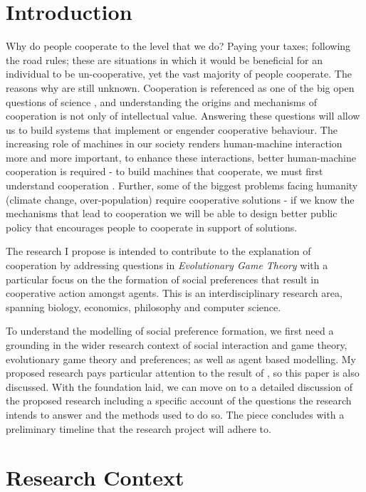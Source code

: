 \documentclass[11pt]{article}
\newcommand*{\np}{\par\noindent\newline}
\begin{document}
\newpage
\tableofcontents
\newpage
\section{Introduction}\label{intro}
Why do people cooperate to the level that we do? Paying your taxes; following
the road rules; these are situations in which it would be beneficial for an
individual to be un-cooperative, yet the vast majority of people cooperate. The
reasons why are still unknown. Cooperation is referenced as one of the big open
questions of science \cite{pennisi_how_2005}, and understanding the origins and
mechanisms of cooperation is not only of intellectual value. Answering these
questions will allow us to build systems that implement or engender cooperative
behaviour. The increasing role of machines in our society renders human-machine
interaction more and more important, to enhance these interactions,
better human-machine cooperation is required - to build machines that
cooperate, we must first understand cooperation \cite{hoc_human_2000}. Further,
some of the biggest problems facing humanity (climate change, over-population)
require cooperative solutions - if we know the mechanisms that lead to
cooperation we will be able to design better public policy that encourages
people to cooperate in support of solutions.

\np The research I propose is intended to contribute to the explanation
of cooperation by addressing questions in \textit{Evolutionary Game Theory}
with a particular focus on the the formation of social preferences that result
in cooperative action amongst agents. This is an interdisciplinary research
area, spanning biology, economics, philosophy and computer science.

\np To understand the modelling of social preference formation, we first need
a grounding in the wider research context of social interaction and game
theory, evolutionary game theory and preferences; as well as agent based
modelling. My proposed research pays particular attention to the result of
\cite{alger_homo_2013}, so this paper is also discussed. With the foundation
laid, we can move on to a detailed discussion of the proposed research
including a specific account of the questions the research intends to answer
and the methods used to do so. The piece concludes with a preliminary timeline that the research project will adhere to.
\section{Research Context}
\end{document}
